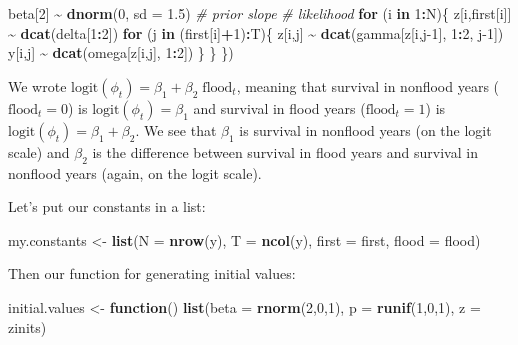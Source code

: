 \documentclass[
  12pt,
]{krantz}
\newenvironment{Shaded}{\begin{snugshade}}{\end{snugshade}}
\newcommand{\AttributeTok}[1]{\textcolor[rgb]{0.13,0.29,0.53}{#1}}
\newcommand{\CommentTok}[1]{\textcolor[rgb]{0.56,0.35,0.01}{\textit{#1}}}
\newcommand{\ControlFlowTok}[1]{\textcolor[rgb]{0.13,0.29,0.53}{\textbf{#1}}}
\newcommand{\DecValTok}[1]{\textcolor[rgb]{0.00,0.00,0.81}{#1}}
\newcommand{\FloatTok}[1]{\textcolor[rgb]{0.00,0.00,0.81}{#1}}
\newcommand{\FunctionTok}[1]{\textcolor[rgb]{0.13,0.29,0.53}{\textbf{#1}}}
\newcommand{\NormalTok}[1]{#1}
\newcommand{\OtherTok}[1]{\textcolor[rgb]{0.56,0.35,0.01}{#1}}
\newcommand{\SpecialCharTok}[1]{\textcolor[rgb]{0.81,0.36,0.00}{\textbf{#1}}}
\begin{document}
\begin{Shaded}
\begin{Highlighting}[]
\NormalTok{  beta[}\DecValTok{2}\NormalTok{] }\SpecialCharTok{\textasciitilde{}} \FunctionTok{dnorm}\NormalTok{(}\DecValTok{0}\NormalTok{, }\AttributeTok{sd =} \FloatTok{1.5}\NormalTok{) }\CommentTok{\# prior slope}
  \CommentTok{\# likelihood}
  \ControlFlowTok{for}\NormalTok{ (i }\ControlFlowTok{in} \DecValTok{1}\SpecialCharTok{:}\NormalTok{N)\{}
\NormalTok{    z[i,first[i]] }\SpecialCharTok{\textasciitilde{}} \FunctionTok{dcat}\NormalTok{(delta[}\DecValTok{1}\SpecialCharTok{:}\DecValTok{2}\NormalTok{])}
    \ControlFlowTok{for}\NormalTok{ (j }\ControlFlowTok{in}\NormalTok{ (first[i]}\SpecialCharTok{+}\DecValTok{1}\NormalTok{)}\SpecialCharTok{:}\NormalTok{T)\{}
\NormalTok{      z[i,j] }\SpecialCharTok{\textasciitilde{}} \FunctionTok{dcat}\NormalTok{(gamma[z[i,j}\DecValTok{{-}1}\NormalTok{], }\DecValTok{1}\SpecialCharTok{:}\DecValTok{2}\NormalTok{, j}\DecValTok{{-}1}\NormalTok{])}
\NormalTok{      y[i,j] }\SpecialCharTok{\textasciitilde{}} \FunctionTok{dcat}\NormalTok{(omega[z[i,j], }\DecValTok{1}\SpecialCharTok{:}\DecValTok{2}\NormalTok{])}
\NormalTok{    \}}
\NormalTok{  \}}
\NormalTok{\})}
\end{Highlighting}
\end{Shaded}

We wrote \(\text{logit}(\phi_t) = \beta_1 + \beta_2 \; \text{flood}_t\), meaning that survival in nonflood years (\(\text{flood}_t = 0\)) is \(\text{logit}(\phi_t) = \beta_1\) and survival in flood years (\(\text{flood}_t = 1\)) is \(\text{logit}(\phi_t) = \beta_1 + \beta_2\). We see that \(\beta_1\) is survival in nonflood years (on the logit scale) and \(\beta_2\) is the difference between survival in flood years and survival in nonflood years (again, on the logit scale).

Let's put our constants in a list:

\begin{Shaded}
\begin{Highlighting}[]
\NormalTok{my.constants }\OtherTok{\textless{}{-}} \FunctionTok{list}\NormalTok{(}\AttributeTok{N =} \FunctionTok{nrow}\NormalTok{(y),}
                     \AttributeTok{T =} \FunctionTok{ncol}\NormalTok{(y),}
                     \AttributeTok{first =}\NormalTok{ first,}
                     \AttributeTok{flood =}\NormalTok{ flood)}
\end{Highlighting}
\end{Shaded}

Then our function for generating initial values:

\begin{Shaded}
\begin{Highlighting}[]
\NormalTok{initial.values }\OtherTok{\textless{}{-}} \ControlFlowTok{function}\NormalTok{() }\FunctionTok{list}\NormalTok{(}\AttributeTok{beta =} \FunctionTok{rnorm}\NormalTok{(}\DecValTok{2}\NormalTok{,}\DecValTok{0}\NormalTok{,}\DecValTok{1}\NormalTok{),}
                                  \AttributeTok{p =} \FunctionTok{runif}\NormalTok{(}\DecValTok{1}\NormalTok{,}\DecValTok{0}\NormalTok{,}\DecValTok{1}\NormalTok{),}
                                  \AttributeTok{z =}\NormalTok{ zinits)}
\end{Highlighting}
\end{Shaded}
\end{document}
